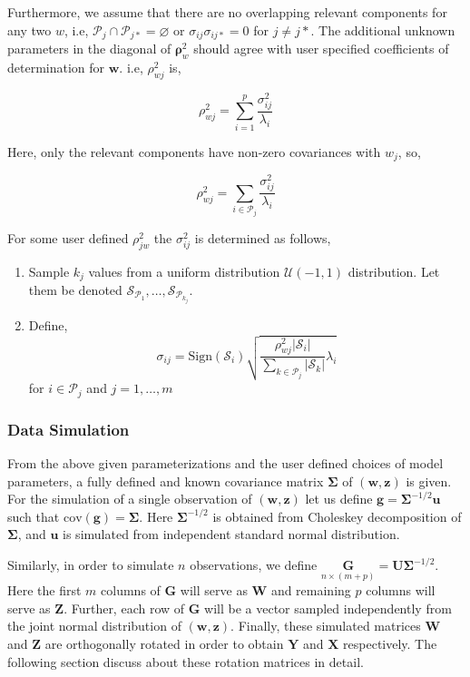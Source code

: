 \documentclass[review]{elsarticle}
\providecommand{\tightlist}{%
  \setlength{\itemsep}{0pt}\setlength{\parskip}{0pt}}
\theoremstyle{definition}
\theoremstyle{definition}
\theoremstyle{remark}
\begin{document}
Furthermore, we assume that there are no overlapping relevant components
for any two \(w\), i.e,
\(\mathcal{P}_j \cap \mathcal{P}_{j*} = \varnothing\) or
\(\sigma_{ij}\sigma_{ij*} = 0\) for \(j\ne j*\). The additional unknown
parameters in the diagonal of \(\boldsymbol{\rho}_w^2\) should agree
with user specified coefficients of determination for \(\mathbf{w}\).
i.e, \(\rho_{wj}^2\) is,

\[
\rho_{wj}^2 = \sum_{i = 1}^p\frac{\sigma_{ij}^2}{\lambda_i}
\]

Here, only the relevant components have non-zero covariances with
\(w_j\), so,

\[
\rho_{wj}^2 = \sum_{i \in \mathcal{P}_j}\frac{\sigma_{ij}^2}{\lambda_i}
\]

For some user defined \(\rho_{jw}^2\) the \(\sigma_{ij}^2\) is
determined as follows,

\begin{enumerate}
\def\labelenumi{\arabic{enumi}.}
\tightlist
\item
  Sample \(k_j\) values from a uniform distribution
  \(\mathcal{U}(-1, 1)\) distribution. Let them be denoted
  \(\mathcal{S}_{\mathcal{P}_1}, \ldots, \mathcal{S}_{\mathcal{P}_{k_j}}\).
\item
  Define,
  \[\sigma_{ij} = \text{Sign}\left(\mathcal{S}_i\right)\sqrt{\frac{\rho_{wj}^2\left|\mathcal{S}_i\right|}{\sum_{k\in \mathcal{P}_j}\left|\mathcal{S}_k\right|} \lambda_i}\]
  for \(i \in \mathcal{P}_j\) and \(j = 1, \ldots, m\)
\end{enumerate}

\subsubsection{Data Simulation}\label{data-simulation}

From the above given parameterizations and the user defined choices of
model parameters, a fully defined and known covariance matrix
\(\boldsymbol{\Sigma}\) of \((\mathbf{w, z})\) is given. For the
simulation of a single observation of \((\mathbf{w, z})\) let us define
\(\mathbf{g} = \boldsymbol{\Sigma}^{-1/2}\mathbf{u}\) such that
\(\text{cov}(\mathbf{g}) = \boldsymbol{\Sigma}\). Here
\(\boldsymbol{\Sigma}^{-1/2}\) is obtained from Choleskey decomposition
of \(\boldsymbol{\Sigma}\), and \(\mathbf{u}\) is simulated from
independent standard normal distribution.

Similarly, in order to simulate \(n\) observations, we define
\(\underset{n \times (m + p)}{\mathbf{G}} = \mathbf{U}\boldsymbol{\Sigma}^{-1/2}\).
Here the first \(m\) columns of \(\mathbf{G}\) will serve as
\(\mathbf{W}\) and remaining \(p\) columns will serve as \(\mathbf{Z}\).
Further, each row of \(\mathbf{G}\) will be a vector sampled
independently from the joint normal distribution of
\(\left(\mathbf{w}, \mathbf{z}\right)\). Finally, these simulated
matrices \(\mathbf{W}\) and \(\mathbf{Z}\) are orthogonally rotated in
order to obtain \(\mathbf{Y}\) and \(\mathbf{X}\) respectively. The
following section discuss about these rotation matrices in detail.
\end{document}
